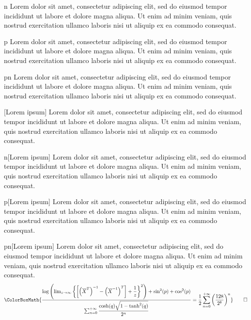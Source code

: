 \begin{example}{n}
	Lorem dolor sit amet, consectetur adipiscing elit, sed do eiusmod tempor incididunt ut labore et dolore magna aliqua. Ut enim ad minim veniam, quis nostrud exercitation ullamco laboris nisi ut aliquip ex ea commodo consequat.
\end{example}

\begin{example}{p}
	Lorem dolor sit amet, consectetur adipiscing elit, sed do eiusmod tempor incididunt ut labore et dolore magna aliqua. Ut enim ad minim veniam, quis nostrud exercitation ullamco laboris nisi ut aliquip ex ea commodo consequat.
\end{example}

\begin{example}{pn}
	Lorem dolor sit amet, consectetur adipiscing elit, sed do eiusmod tempor incididunt ut labore et dolore magna aliqua. Ut enim ad minim veniam, quis nostrud exercitation ullamco laboris nisi ut aliquip ex ea commodo consequat.
\end{example}

\begin{example}{}[Lorem ipsum]
	Lorem dolor sit amet, consectetur adipiscing elit, sed do eiusmod tempor incididunt ut labore et dolore magna aliqua. Ut enim ad minim veniam, quis nostrud exercitation ullamco laboris nisi ut aliquip ex ea commodo consequat.
\end{example}

\begin{example}{n}[Lorem ipsum]
	Lorem dolor sit amet, consectetur adipiscing elit, sed do eiusmod tempor incididunt ut labore et dolore magna aliqua. Ut enim ad minim veniam, quis nostrud exercitation ullamco laboris nisi ut aliquip ex ea commodo consequat.
\end{example}

\begin{example}{p}[Lorem ipsum]
	Lorem dolor sit amet, consectetur adipiscing elit, sed do eiusmod tempor incididunt ut labore et dolore magna aliqua. Ut enim ad minim veniam, quis nostrud exercitation ullamco laboris nisi ut aliquip ex ea commodo consequat.
\end{example}

\begin{example}{pn}[Lorem ipsum]
	Lorem dolor sit amet, consectetur adipiscing elit, sed do eiusmod tempor incididunt ut labore et dolore magna aliqua. Ut enim ad minim veniam, quis nostrud exercitation ullamco laboris nisi ut aliquip ex ea commodo consequat.
	\begin{equation*}
		\ColorBoxMath{\dfrac{\log\left(\lim_{z\to\infty}\left\{\left[\left(\overline{X}^{T}\right)^{-1}-\left(\overline{X}^{-1}\right)^T\right]+\dfrac{1}{z}\right\}^2\right)+\sin^2(p)+\cos^2(p)}{\sum_{n=0}^{+\infty}\dfrac{\cosh(q)\sqrt{1-\tanh^2(q)}}{2^n}}=\dfrac{1}{2}\sum_{n=0}^{+\infty}\left(\dfrac{128}{2^8}\right)^n}\qedhere
	\end{equation*}
\end{example}

